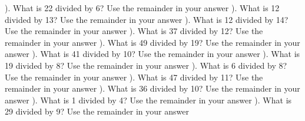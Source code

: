\documentclass{article}%
\begin{document}
\newline%
). What is 22 divided by 6? Use the remainder in your answer%
\newline%
\newline%
). What is 12 divided by 13? Use the remainder in your answer%
\newline%
\newline%
). What is 12 divided by 14? Use the remainder in your answer%
\newline%
\newline%
). What is 37 divided by 12? Use the remainder in your answer%
\newline%
\newline%
). What is 49 divided by 19? Use the remainder in your answer%
\newline%
\newline%
). What is 41 divided by 10? Use the remainder in your answer%
\newline%
\newline%
). What is 19 divided by 8? Use the remainder in your answer%
\newline%
\newline%
). What is 6 divided by 8? Use the remainder in your answer%
\newline%
\newline%
). What is 47 divided by 11? Use the remainder in your answer%
\newline%
\newline%
). What is 36 divided by 10? Use the remainder in your answer%
\newline%
\newline%
). What is 1 divided by 4? Use the remainder in your answer%
\newline%
\newline%
). What is 29 divided by 9? Use the remainder in your answer%
\newline%
\newline%
\end{document}

